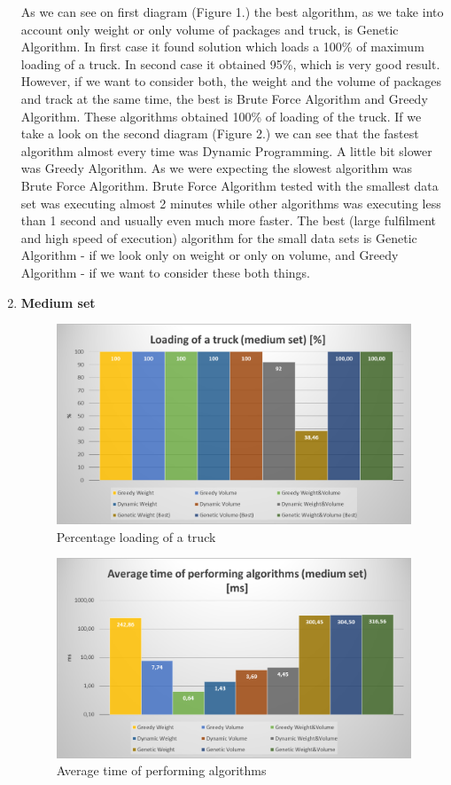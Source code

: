 \documentclass[conference,compsoc]{IEEEtran}
\begin{document}
\begin{enumerate}
As we can see on first diagram (Figure 1.) the best algorithm, as we take into account only weight or only volume of packages and truck, is Genetic Algorithm. In first case it found solution which loads a 100\% of maximum loading of a truck. In second case it obtained 95\%, which is very good result. However, if we want to consider both, the weight and the volume of packages and track at the same time, the best is Brute Force Algorithm and Greedy Algorithm. These algorithms obtained 100\% of loading of the truck.
If we take a look on the second diagram (Figure 2.) we can see that the fastest algorithm almost every time was Dynamic Programming. A little bit slower was Greedy Algorithm. As we were expecting the slowest algorithm was Brute Force Algorithm. Brute Force Algorithm tested with the smallest data set was executing almost 2 minutes while other algorithms was executing  less than 1 second and usually even much more faster.
The best (large fulfilment and high speed of execution) algorithm for the small data sets is Genetic Algorithm - if we look only on weight or only on volume, and Greedy Algorithm - if we want to consider these both things.\\

\item \textbf{Medium set}
\begin{figure}[H]
  \centering
  \includegraphics[width=\columnwidth]{image013.png}
  \caption{Percentage loading of a truck }
\end{figure}

\begin{figure}[H]
  \centering
  \includegraphics[width=\columnwidth]{image019.png}
  \caption{Average time of performing algorithms}
\end{figure}


\end{enumerate}
\end{document}
